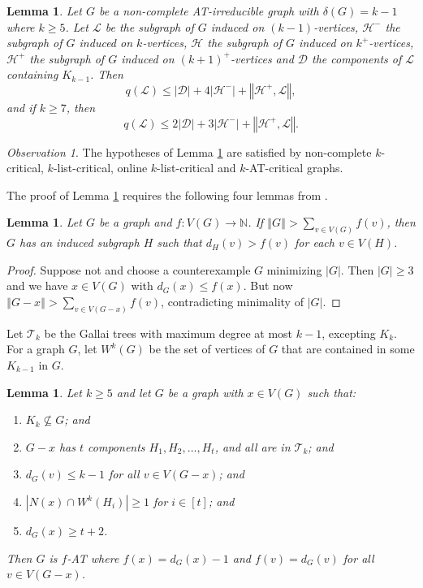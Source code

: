 \documentclass[10pt]{article}
\theoremstyle{plain}
\newtheorem{lem}[thm]{Lemma}
\theoremstyle{definition}
\theoremstyle{remark}
\newtheorem*{observation}{Observation}
\newcommand{\fancy}[1]{\mathcal{#1}}
\newcommand{\IN}{\mathbb{N}}
\newcommand{\D}{\fancy{D}}
\newcommand{\T}{\fancy{T}}
\renewcommand{\L}{\fancy{L}}
\newcommand{\HH}{\fancy{H}}
\newcommand{\card}[1]{\left|#1\right|}
\newcommand{\size}[1]{\left\Vert#1\right\Vert}
\newcommand{\func}[3]{#1\colon #2 \rightarrow #3}
\newcommand{\irange}[1]{\left[#1\right]}
\def\D{\fancy{D}}
\begin{document}
\begin{lem}\label{qLemma}
	Let $G$ be a non-complete AT-irreducible graph with $\delta(G) = k-1$ where $k \ge 5$.  Let $\L$ be the subgraph of $G$ induced on $(k-1)$-vertices, $\HH^-$ the subgraph of $G$ induced on $k$-vertices, 
	$\HH$ the subgraph of $G$ induced on $k^+$-vertices, $\HH^+$ the subgraph of $G$ induced on $(k+1)^+$-vertices and $\D$ the components of $\L$ containing $K_{k-1}$.  Then
	\[q(\L) \le \card{\D} + 4\card{\HH^-} + \size{\HH^+, \L},\] and if $k \ge 7$, then
	\[q(\L) \le 2\card{\D} + 3\card{\HH^-} + \size{\HH^+, \L}.\]
\end{lem}

\begin{observation}
The hypotheses of Lemma \ref{qLemma} are satisfied by non-complete $k$-critical, $k$-list-critical, online $k$-list-critical and $k$-AT-critical graphs.
\end{observation}

The proof of Lemma \ref{qLemma} requires the following four lemmas from \cite{OreVizing}.

\begin{lem}\label{DegenerateEuler}
Let $G$ be a graph and $\func{f}{V(G)}{\IN}$.  If $\size{G} > \sum_{v \in V(G)} f(v)$, then $G$ has an induced subgraph $H$ such that $d_H(v) > f(v)$ for each $v \in V(H)$.
\end{lem}
\begin{proof}
Suppose not and choose a counterexample $G$ minimizing $\card{G}$. Then $\card{G} \ge 3$ and we have $x \in V(G)$ with $d_G(x) \leq f(x)$. But now $\size{G-x} > \sum_{v \in V(G-x)} f(v)$, contradicting minimality of $\card{G}$.
\end{proof}

Let $\T_k$ be the Gallai trees with maximum degree at most $k-1$, excepting $K_k$. For a graph $G$, let $W^k(G)$ be the set of vertices of $G$ that are contained in some $K_{k-1}$ in $G$.  

\begin{lem}\label{ConfigurationTypeOneEuler}
Let $k \ge 5$ and let $G$ be a graph with $x \in V(G)$ such that:
\begin{enumerate}
\item $K_k \not \subseteq G$; and
\item $G-x$ has $t$ components $H_1, H_2, \ldots, H_t$, and all are in $\T_k$; and
\item $d_G(v) \leq k - 1$ for all $v \in V(G-x)$; and
\item $\card{N(x) \cap W^k(H_i)} \ge 1$ for $i \in \irange{t}$; and
\item $d_G(x) \ge t+2$.
\end{enumerate}

\noindent Then $G$ is $f$-AT where $f(x) = d_G(x) - 1$ and $f(v) = d_G(v)$ for all $v \in V(G - x)$.
\end{lem}
\end{document}
